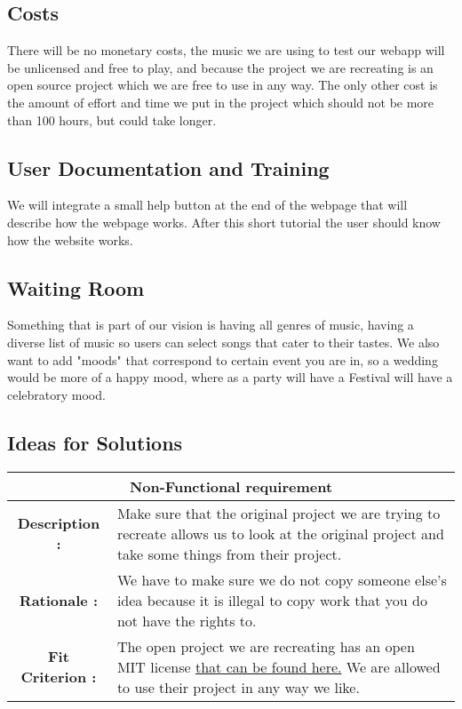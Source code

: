 \documentclass[12pt, titlepage]{article}
\begin{document}
\subsection{Costs}

There will be no monetary costs, the music we are using to test our webapp will be unlicensed and free to play, and because the project we are recreating is an open source project which we are free to use in any way. The only other cost is the amount of effort and time we put in the project which should not be more than 100 hours, but could take longer.

\subsection{User Documentation and Training}

We will integrate a small help button at the end of the webpage that will describe how the webpage works. After this short tutorial the user should know how the website works.

\subsection{Waiting Room}

Something that is part of our vision is having all genres of music, having a diverse list of music so users can select songs that cater to their tastes. We also want to add "moods" that correspond to certain event you are in, so a wedding would be more of a happy mood, where as a party will have a Festival will have a celebratory mood.

\subsection{Ideas for Solutions}
\begin{center}
\begin{table}[H]
\begin{tabularx}{\textwidth}{| c X |}
\hline
\multicolumn{2}{|c|}{\textbf{Non-Functional requirement}}\\
\hline
\textbf{Description : } & Make sure that the original project we are trying to recreate allows us to look at the original project and take some things from their project. \\
\hline
\textbf{Rationale : } & We have to make sure we do not copy someone else's idea because it is illegal to copy work that you do not have the rights to. \\
\hline
\textbf{Fit Criterion : } & The open project we are recreating has an open MIT license \href{LICENSE.txt} {that can be found here.} We are allowed to use their project in any way we like.\\
\hline
\end{tabularx}
\end{table}
\end{center}
\end{document}
